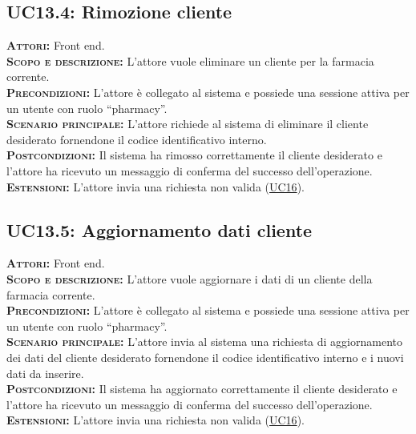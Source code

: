 \subsection{UC13.4: Rimozione cliente}
\label{sec:UC134}
\textsc{\textbf{Attori:}} Front end.\\
\textsc{\textbf{Scopo e descrizione:}} L'attore vuole eliminare un cliente per la farmacia corrente.\\
\textsc{\textsc{\textbf{Precondizioni:}}} L'attore è collegato al sistema e possiede una sessione attiva per un utente con ruolo ``pharmacy''.\\
\textsc{\textbf{Scenario principale:}} L'attore richiede al sistema di eliminare il cliente desiderato fornendone il codice identificativo interno.\\
\textsc{\textbf{Postcondizioni:}} Il sistema ha rimosso correttamente il cliente desiderato e l'attore ha ricevuto un messaggio di conferma del successo dell'operazione.\\
\textsc{\textbf{Estensioni:}} L'attore invia una richiesta non valida (\hyperref[sec:UC16]{UC16}).

\subsection{UC13.5: Aggiornamento dati cliente}
\label{sec:UC135}
\textsc{\textbf{Attori:}} Front end.\\
\textsc{\textbf{Scopo e descrizione:}} L'attore vuole aggiornare i dati di un cliente della farmacia corrente.\\
\textsc{\textsc{\textbf{Precondizioni:}}} L'attore è collegato al sistema e possiede una sessione attiva per un utente con ruolo ``pharmacy''.\\
\textsc{\textbf{Scenario principale:}} L'attore invia al sistema una richiesta di aggiornamento dei dati del cliente desiderato fornendone il codice identificativo interno e i nuovi dati da inserire.\\
\textsc{\textbf{Postcondizioni:}} Il sistema ha aggiornato correttamente il cliente desiderato e l'attore ha ricevuto un messaggio di conferma del successo dell'operazione.\\
\textsc{\textbf{Estensioni:}} L'attore invia una richiesta non valida (\hyperref[sec:UC16]{UC16}).

